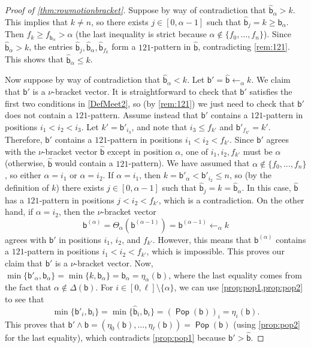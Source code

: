\documentclass[11pt]{amsart}
\DeclareMathOperator{\Pop}{\mathsf{Pop}}
\theoremstyle{definition}
\begin{document}
\begin{proof}[Proof of \cref{thm:rowmotionbracket}]
Suppose by way of contradiction that $\widehat {\mathsf b}_\alpha>k$. This implies that $k\neq n$, so there exists $j\in[0,\alpha-1]$ such that $\widehat{\mathsf b}_j=k\geq\mathsf b_\alpha$. Then $f_k\geq f_{\mathsf b_\alpha}>\alpha$ (the last inequality is strict because $\alpha\not\in\{f_0,\ldots,f_n\}$). Since $\widehat{\mathsf b}_\alpha>k$, the entries $\widehat{\mathsf b}_j,\widehat{\mathsf b}_\alpha,\widehat{\mathsf b}_{f_k}$ form a $121$-pattern in $\widehat{\mathsf b}$, contradicting \cref{rem:121}. This shows that $\widehat{\mathsf b}_\alpha\leq k$.  

Now suppose by way of contradiction that $\widehat {\mathsf b}_\alpha<k$. Let $\mathsf b'=\widehat{\mathsf b}\leftarrow_\alpha k$. We claim that $\mathsf b'$ is a $\nu$-bracket vector. It is straightforward to check that $\mathsf b'$ satisfies the first two conditions in \cref{DefMeet2}, so (by \cref{rem:121}) we just need to check that $\mathsf b'$ does not contain a $121$-pattern. Assume instead that $\mathsf b'$ contains a $121$-pattern in positions $i_1<i_2<i_3$. Let $k'=\mathsf b'_{i_3}$, and note that $i_3\leq f_{k'}$ and $\mathsf b'_{f_{k'}}=k'$. Therefore, $\mathsf b'$ contains a $121$-pattern in positions $i_1<i_2<f_{k'}$. Since $\mathsf b'$ agrees with the $\nu$-bracket vector $\widehat{\mathsf b}$ except in position $\alpha$, one of $i_1,i_2,f_{k'}$ must be $\alpha$ (otherwise, $\widehat{\mathsf b}$ would contain a $121$-pattern). We have assumed that $\alpha\not\in\{f_0,\ldots,f_n\}$, so either $\alpha=i_1$ or $\alpha=i_2$. If $\alpha=i_1$, then $k=\mathsf b'_\alpha<\mathsf b'_{i_2}\leq n$, so (by the definition of $k$) there exists $j\in[0,\alpha-1]$ such that $\widehat{\mathsf b}_j=k=\widehat{\mathsf b}_{\alpha}$. In this case, $\widehat{\mathsf b}$ has a $121$-pattern in positions $j<i_2<f_{k'}$, which is a contradiction. On the other hand, if $\alpha=i_2$, then the $\nu$-bracket vector \[\mathsf b^{(\alpha)}=\Theta_\alpha(\mathsf b^{(\alpha-1)})=\mathsf b^{(\alpha-1)}\leftarrow_\alpha k\] agrees with $\mathsf b'$ in positions $i_1$, $i_2$, and $f_{k'}$. However, this means that $\mathsf b^{(\alpha)}$ contains a $121$-pattern in positions $i_1<i_2<f_{k'}$, which is impossible. This proves our claim that $\mathsf b'$ is a $\nu$-bracket vector. Now, $\min\{\mathsf b'_\alpha,\mathsf b_\alpha\}=\min\{k,\mathsf b_\alpha\}=\mathsf b_\alpha=\eta_\alpha(\mathsf b)$, where the last equality comes from the fact that $\alpha\not\in\Delta(\mathsf b)$. For $i\in[0,\ell]\setminus\{\alpha\}$, we can use \cref{prop:pop1,prop:pop2} to see that \[\min\{\mathsf b'_i,\mathsf b_i\}=\min\{\widehat{\mathsf b}_i,\mathsf b_i\}=(\Pop(\mathsf b))_i=\eta_i(\mathsf b).\] This proves that $\mathsf b'\wedge\mathsf b=(\eta_0(\mathsf b),\ldots,\eta_\ell(\mathsf b))=\Pop(\mathsf b)$ (using \cref{prop:pop2} for the last equality), which contradicts \cref{prop:pop1} because $\mathsf b'>\widehat{\mathsf b}$.  
\end{proof}
\end{document}
